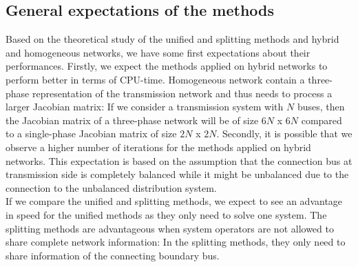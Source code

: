 \documentclass[10pt,journal]{article}
\begin{document}
\subsection{General expectations of the methods} \label{sect:advantages}
Based on the theoretical study of the unified and splitting methods and hybrid and homogeneous networks, we have some first expectations about their performances. Firstly, we expect the methods applied on hybrid networks to perform better in terms of CPU-time. Homogeneous network contain a three-phase representation of the transmission network and thus needs to process a larger Jacobian matrix: If we consider a transmission system with $N$ buses, then the Jacobian matrix of a three-phase network will be of size $6N$ x $6N$ compared to a single-phase Jacobian matrix of size $2N$ x $2N$. Secondly, it is possible that we observe a higher number of iterations for the methods applied on hybrid networks. This expectation is based on the assumption that the connection bus at transmission side is completely balanced while it might be unbalanced due to the connection to the unbalanced distribution system. \\
If we compare the unified and splitting methods, we expect to see an advantage in speed for the unified methods as they only need to solve one system. The splitting methods are advantageous when system operators are not allowed to share complete network information: In the splitting methods, they only need to share information of the connecting boundary bus. 

\newpage 
\end{document}
